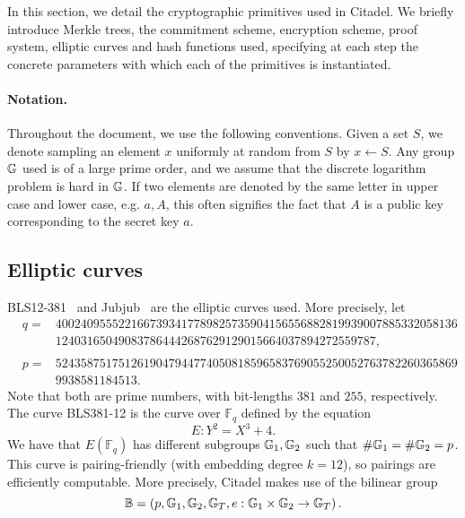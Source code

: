 
In this section, we detail the cryptographic primitives used in Citadel. We briefly introduce Merkle trees, the commitment scheme, encryption scheme, proof system, elliptic curves and hash functions used, specifying at each step the concrete parameters with which each of the primitives is instantiated.

\paragraph{Notation.} Throughout the document, we use the following conventions. Given a set $S$, we denote sampling an element $x$ uniformly at random from $S$ by $x\gets S$. Any group $\mathbb{G}$ used is of a large prime order, and we assume that the discrete logarithm problem is hard in $\mathbb{G}$. If two elements are denoted by the same letter in upper case and lower case, e.g. $a, A$, this often signifies the fact that $A$ is a public key corresponding to the secret key $a$. 

\subsection{Elliptic curves}\label{sec:elliptic_curves}

BLS12-381~\cite{zcashBLS} and Jubjub~\cite{zcashJubJub} are the elliptic curves used. More precisely, let
\[\begin{array}{lll}
	& q = & 4002409555221667393417789825735904156556882819939007885332058136 \\
	& & 124031650490837864442687629129015664037894272559787,\\
	\\
	& p = & 5243587517512619047944774050818596583769055250052763782260365869 \\
	& & 9938581184513.
\end{array}\]
Note that both are prime numbers, with bit-lengths $381$ and $255$, respectively. The curve BLS381-12 is the curve over $\mathbb{F}_q$ defined by the equation
\[E: Y^2 = X^3 + 4.\]
We have that $E(\mathbb{F}_q)$ has different subgroups $\mathbb{G}_1, \mathbb{G}_2$ such that $\#\mathbb{G}_1 = \#\mathbb{G}_2 = p$. This curve is pairing-friendly (with embedding degree $k=12$), so pairings are efficiently computable. More precisely, Citadel makes use of the bilinear group 
\[\mathbb{B}=\left( p, \mathbb{G}_1, \mathbb{G}_2, \mathbb{G}_T, e: \mathbb{G}_1\times\mathbb{G}_2 \rightarrow \mathbb{G}_T \right).\]

